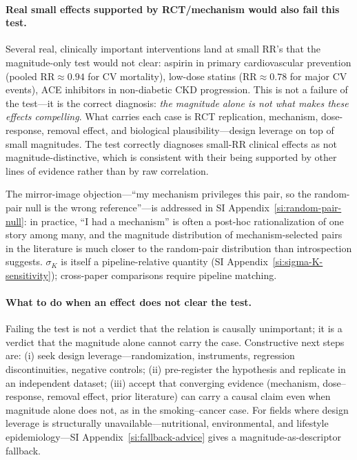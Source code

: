 \paragraph{Real small effects supported by RCT/mechanism would also fail this test.} Several real, clinically important interventions land at small RR's that the magnitude-only test would not clear: aspirin in primary cardiovascular prevention (pooled $\mathrm{RR}\approx 0.94$ for CV mortality), low-dose statins ($\mathrm{RR}\approx 0.78$ for major CV events), ACE inhibitors in non-diabetic CKD progression. This is not a failure of the test---it is the correct diagnosis: \emph{the magnitude alone is not what makes these effects compelling}. What carries each case is RCT replication, mechanism, dose-response, removal effect, and biological plausibility---design leverage on top of small magnitudes. The test correctly diagnoses small-RR clinical effects as not magnitude-distinctive, which is consistent with their being supported by other lines of evidence rather than by raw correlation.

The mirror-image objection---``my mechanism privileges this pair, so the random-pair null is the wrong reference''---is addressed in SI Appendix~\ref{si:random-pair-null}: in practice, ``I had a mechanism'' is often a post-hoc rationalization of one story among many, and the magnitude distribution of mechanism-selected pairs in the literature is much closer to the random-pair distribution than introspection suggests. $\sigma_K$ is itself a pipeline-relative quantity (SI Appendix~\ref{si:sigma-K-sensitivity}); cross-paper comparisons require pipeline matching.

\paragraph{What to do when an effect does not clear the test.} Failing the test is not a verdict that the relation is causally unimportant; it is a verdict that the magnitude alone cannot carry the case. Constructive next steps are: (i) seek design leverage---randomization, instruments, regression discontinuities, negative controls; (ii) pre-register the hypothesis and replicate in an independent dataset; (iii) accept that converging evidence (mechanism, dose--response, removal effect, prior literature) can carry a causal claim even when magnitude alone does not, as in the smoking--cancer case. For fields where design leverage is structurally unavailable---nutritional, environmental, and lifestyle epidemiology---SI Appendix~\ref{si:fallback-advice} gives a magnitude-as-descriptor fallback.

